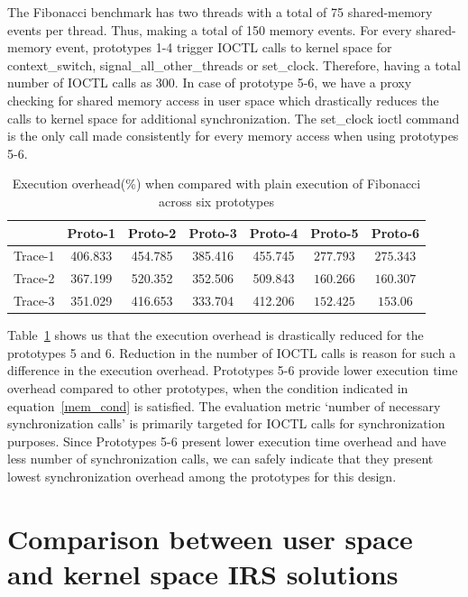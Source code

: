 The Fibonacci benchmark has two threads with a total of 75 shared-memory events per thread. 
Thus, making a total of 150 memory events. 
For every shared-memory event, prototypes 1-4 trigger IOCTL calls to kernel space for context\_switch, signal\_all\_other\_threads or set\_clock. 
Therefore, having a total number of IOCTL calls as 300. 
In case of prototype 5-6, we have a proxy checking for shared memory access  in user space which drastically reduces the calls to kernel space for additional synchronization. 
The set\_clock ioctl command is the only call made consistently for every memory access when using prototypes 5-6.

\begin{table}[h]
\begin{center}
 \begin{tabular}{|c c c c c c c|} 
 \hline
 & Proto-1 & Proto-2 & Proto-3 & Proto-4 & Proto-5 & Proto-6\\ %
 \hline
 Trace-1 & 406.833 & 454.785 & 385.416 & 455.745 & $277.793$ & $275.343$ \\ 
 Trace-2 & 367.199 & 520.352 & 352.506 & 509.843 & $160.266$ & $160.307$ \\
 Trace-3 & 351.029 & 416.653 & 333.704 & 412.206 & $152.425$ & $153.06$\\
 \hline
\end{tabular}
\end{center}
\caption{Execution overhead(\%) when compared with plain execution of Fibonacci across six prototypes}
\label{fib_exec_over}
\end{table}

Table~\ref{fib_exec_over} shows us that the execution overhead is drastically reduced for the prototypes 5 and 6. 
Reduction in the number of IOCTL calls is reason for such a difference in the execution overhead. 
Prototypes 5-6 provide lower execution time overhead compared to other prototypes, when the condition indicated in equation~\ref{mem_cond} is satisfied. 
The evaluation metric `number of necessary synchronization calls' is primarily targeted for IOCTL calls for synchronization purposes. 
Since Prototypes 5-6 present lower execution time overhead and have less number of synchronization calls, we can safely indicate that they present lowest synchronization overhead among the prototypes for this design.  

\section{Comparison between user space and kernel space IRS solutions}

